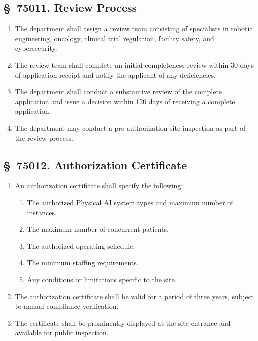 \subsection{\S~75011. Review Process}

\begin{enumerate}[label=(\alph*)]
\item The department shall assign a review team consisting of specialists in
  robotic engineering, oncology, clinical trial regulation, facility safety,
  and cybersecurity.

\item The review team shall complete an initial completeness review within 30
  days of application receipt and notify the applicant of any deficiencies.

\item The department shall conduct a substantive review of the complete
  application and issue a decision within 120 days of receiving a complete
  application.

\item The department may conduct a pre-authorization site inspection as part
  of the review process.
\end{enumerate}

\subsection{\S~75012. Authorization Certificate}

\begin{enumerate}[label=(\alph*)]
\item An authorization certificate shall specify the following:
  \begin{enumerate}[label=(\arabic*)]
  \item The authorized Physical AI system types and maximum number of instances.
  \item The maximum number of concurrent patients.
  \item The authorized operating schedule.
  \item The minimum staffing requirements.
  \item Any conditions or limitations specific to the site.
  \end{enumerate}

\item The authorization certificate shall be valid for a period of three years,
  subject to annual compliance verification.

\item The certificate shall be prominently displayed at the site entrance and
  available for public inspection.
\end{enumerate}

